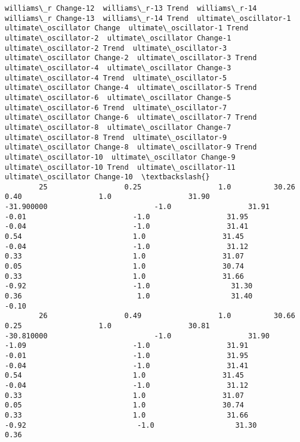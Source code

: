 \documentclass[11pt]{article}
\begin{document}
\begin{Verbatim}[commandchars=\\\{\}]
            williams\_r Change-12  williams\_r-13 Trend  williams\_r-14  williams\_r Change-13  williams\_r-14 Trend  ultimate\_oscillator-1  ultimate\_oscillator Change  ultimate\_oscillator-1 Trend  ultimate\_oscillator-2  ultimate\_oscillator Change-1  ultimate\_oscillator-2 Trend  ultimate\_oscillator-3  ultimate\_oscillator Change-2  ultimate\_oscillator-3 Trend  ultimate\_oscillator-4  ultimate\_oscillator Change-3  ultimate\_oscillator-4 Trend  ultimate\_oscillator-5  ultimate\_oscillator Change-4  ultimate\_oscillator-5 Trend  ultimate\_oscillator-6  ultimate\_oscillator Change-5  ultimate\_oscillator-6 Trend  ultimate\_oscillator-7  ultimate\_oscillator Change-6  ultimate\_oscillator-7 Trend  ultimate\_oscillator-8  ultimate\_oscillator Change-7  ultimate\_oscillator-8 Trend  ultimate\_oscillator-9  ultimate\_oscillator Change-8  ultimate\_oscillator-9 Trend  ultimate\_oscillator-10  ultimate\_oscillator Change-9  ultimate\_oscillator-10 Trend  ultimate\_oscillator-11  ultimate\_oscillator Change-10  \textbackslash{}
        25                  0.25                  1.0          30.26                  0.40                  1.0                  31.90                  -31.900000                         -1.0                  31.91                         -0.01                         -1.0                  31.95                         -0.04                         -1.0                  31.41                          0.54                          1.0                  31.45                         -0.04                         -1.0                  31.12                          0.33                          1.0                  31.07                          0.05                          1.0                  30.74                          0.33                          1.0                  31.66                         -0.92                         -1.0                   31.30                          0.36                           1.0                   31.40                          -0.10   
        26                  0.49                  1.0          30.66                  0.25                  1.0                  30.81                  -30.810000                         -1.0                  31.90                         -1.09                         -1.0                  31.91                         -0.01                         -1.0                  31.95                         -0.04                         -1.0                  31.41                          0.54                          1.0                  31.45                         -0.04                         -1.0                  31.12                          0.33                          1.0                  31.07                          0.05                          1.0                  30.74                          0.33                          1.0                   31.66                         -0.92                          -1.0                   31.30                           0.36   

\end{Verbatim}
\end{document}
